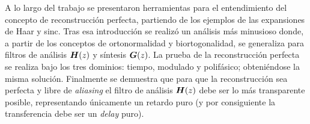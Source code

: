 

	A lo largo del trabajo se presentaron herramientas para el entendimiento del concepto de reconstrucción perfecta, partiendo de los ejemplos de las expansiones de Haar y sinc. Tras esa introducción se realizó un análisis más minusioso donde, a partir de los conceptos de ortonormalidad y biortogonalidad, se generaliza para filtros de análisis $\boldsymbol{H}(z)$ y síntesis $\boldsymbol{G}(z)$. La prueba de la reconstrucción perfecta se realiza bajo los tres dominios: tiempo, modulado y polifásico; obteniéndose la misma solución. Finalmente se demuestra que para que la reconstrucción sea perfecta y libre de \emph{aliasing} el filtro de análisis $\boldsymbol{H}(z)$ debe ser lo más transparente posible, representando únicamente un retardo puro (y por consiguiente la transferencia debe ser un \emph{delay} puro).

